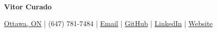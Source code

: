 \begin{center}
    {\LARGE\bfseries Vitor Curado}

    \vspace{3pt}

    \href{https://www.google.com/maps/place/Nepean,+ON+K2C/}{Ottawa, ON} \enspace|\enspace
    (647) 781-7484 \enspace|\enspace
    \href{mailto:vitorbmcurado@proton.me}{Email} \enspace|\enspace
    \href{https://github.com/Vitor-Curado}{GitHub} \enspace|\enspace
    \href{https://www.linkedin.com/in/vitor-curado/}{LinkedIn} \enspace|\enspace
    \href{https://buildhaven.cc/}{Website}
\end{center}
